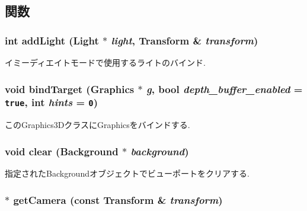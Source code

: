 \subsection{関数}
\hypertarget{classm3g_1_1Graphics3D_e210cacb72c8540df86a6674e3c2dc4f}{
\subsubsection[{addLight}]{\setlength{\rightskip}{0pt plus 5cm}int addLight ({\bf Light} $\ast$ {\em light}, \/  {\bf Transform} \& {\em transform})}}
\label{classm3g_1_1Graphics3D_e210cacb72c8540df86a6674e3c2dc4f}


イミーディエイトモードで使用するライトのバインド. \hypertarget{classm3g_1_1Graphics3D_2173e179f4b2d7130cde46a48794ee66}{
\subsubsection[{bindTarget}]{\setlength{\rightskip}{0pt plus 5cm}void bindTarget ({\bf Graphics} $\ast$ {\em g}, \/  bool {\em depth\_\-buffer\_\-enabled} = {\tt true}, \/  int {\em hints} = {\tt 0})}}
\label{classm3g_1_1Graphics3D_2173e179f4b2d7130cde46a48794ee66}


このGraphics3DクラスにGraphicsをバインドする. \hypertarget{classm3g_1_1Graphics3D_21c4a68a53cfbe0a7cec05d5a56682bf}{
\subsubsection[{clear}]{\setlength{\rightskip}{0pt plus 5cm}void clear ({\bf Background} $\ast$ {\em background})}}
\label{classm3g_1_1Graphics3D_21c4a68a53cfbe0a7cec05d5a56682bf}


指定されたBackgroundオブジェクトでビューポートをクリアする. \hypertarget{classm3g_1_1Graphics3D_570b81f426d1b2b5e8794cffb33422c6}{
\subsubsection[{getCamera}]{ $\ast$ getCamera (const {\bf Transform} \& {\em transform})}}
\label{classm3g_1_1Graphics3D_570b81f426d1b2b5e8794cffb33422c6}


